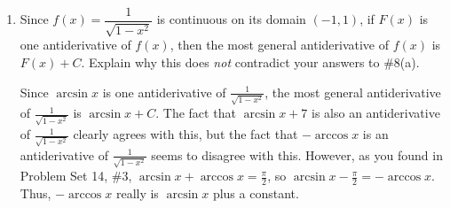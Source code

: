 \documentclass[main]{subfiles}
\begin{document}
\begin{enumerate}[resume]
\begin{enumerate}
    \begin{solution}
      We can check by taking the derivative of each: $\arcsin x$, $\arcsin
      x + 7$, and $- \arccos x$ all have derivative $\frac{1}{\sqrt{1 -
          x^2}}$.  $\arccos x$ has derivative $- \frac{1}{\sqrt{1 -
          x^2}}$, while $\arctan x$ has derivative $\frac{1}{1 + x^2}$. 
    \end{solution}

  \item
    \begin{problem}[\vfill]
      Since $f(x) = \dfrac{1}{\sqrt{1 - x^2}}$ is continuous on its domain
      $(-1, 1)$, if $F(x)$ is one antiderivative of $f(x)$, then the most
      general antiderivative of $f(x)$ is $F(x) + C$.  Explain why this
      does \emph{not} contradict your answers to
      {{{{\#8}}(a)}}.
    \end{problem}

    \begin{solution}
      Since $\arcsin x$ is one antiderivative of $\frac{1}{\sqrt{1 -
          x^2}}$, the most general antiderivative of $\frac{1}{\sqrt{1 -
          x^2}}$ is $\arcsin x + C$.  The fact that $\arcsin x + 7$ is
      also an antiderivative of $\frac{1}{\sqrt{1 - x^2}}$ clearly agrees
      with this, but the fact that $-\arccos x$ is an antiderivative of
      $\frac{1}{\sqrt{1 - x^2}}$ seems to disagree with this.
      However, as you found in
          {{{Problem Set 14}, {{\#3}}}}, $\arcsin x + \arccos x =
          \frac{\pi}{2}$, so $\arcsin x - \frac{\pi}{2} = - \arccos x$.
          Thus, $-\arccos x$ really is $\arcsin x$ plus a constant.
    \end{solution}

  \end{enumerate}

\end{enumerate}
\end{document}

